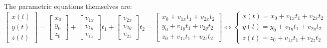 \documentclass{article}
\begin{document}
The parametric equations themselves are:
\[\begin{bmatrix} x(t) \\ y(t) \\ z(t) \end{bmatrix} = \begin{bmatrix} x_0 \\ y_0 \\ z_0 \end{bmatrix} + \begin{bmatrix} v_{1x} \\ v_{1y} \\ v_{1z} \end{bmatrix}t_1 + \begin{bmatrix} v_{2x} \\ v_{2y} \\ v_{2z} \end{bmatrix}t_2 = \begin{bmatrix} x_0 + v_{1x} t_1 + v_{2x} t_2 \\ y_0 + v_{1y} t_1 + v_{2y} t_2 \\ z_0 + v_{1z} t_1 + v_{2z} t_2 \end{bmatrix}  
\iff \left\{\begin{array}{c} x(t) = x_0 + v_{1x} t_1 + v_{2x} t_2 \\ y(t) = y_0 + v_{1y} t_1 + v_{2y} t_2 \\ z(t) = z_0 + v_{1z} t_1 + v_{2z} t_2 \end{array}\right.\]
\end{document}
